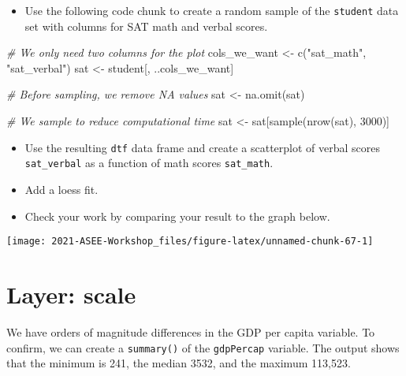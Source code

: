 \documentclass[
]{book}
\newenvironment{Shaded}{\begin{snugshade}}{\end{snugshade}}
\newcommand{\CommentTok}[1]{\textcolor[rgb]{0.56,0.35,0.01}{\textit{#1}}}
\newcommand{\DecValTok}[1]{\textcolor[rgb]{0.00,0.00,0.81}{#1}}
\newcommand{\FunctionTok}[1]{\textcolor[rgb]{0.00,0.00,0.00}{#1}}
\newcommand{\NormalTok}[1]{#1}
\newcommand{\OtherTok}[1]{\textcolor[rgb]{0.56,0.35,0.01}{#1}}
\newcommand{\StringTok}[1]{\textcolor[rgb]{0.31,0.60,0.02}{#1}}
\providecommand{\tightlist}{%
  \setlength{\itemsep}{0pt}\setlength{\parskip}{0pt}}
\begin{document}
\begin{itemize}
\tightlist
\item
  Use the following code chunk to create a random sample of the \texttt{student} data set with columns for SAT math and verbal scores.
\end{itemize}

\begin{Shaded}
\begin{Highlighting}[]
\CommentTok{\# We only need two columns for the plot}
\NormalTok{cols\_we\_want }\OtherTok{\textless{}{-}} \FunctionTok{c}\NormalTok{(}\StringTok{"sat\_math"}\NormalTok{, }\StringTok{"sat\_verbal"}\NormalTok{)}
\NormalTok{sat }\OtherTok{\textless{}{-}}\NormalTok{ student[, ..cols\_we\_want]}

\CommentTok{\# Before sampling, we remove NA values }
\NormalTok{sat }\OtherTok{\textless{}{-}} \FunctionTok{na.omit}\NormalTok{(sat)}

\CommentTok{\# We sample to reduce computational time }
\NormalTok{sat }\OtherTok{\textless{}{-}}\NormalTok{ sat[}\FunctionTok{sample}\NormalTok{(}\FunctionTok{nrow}\NormalTok{(sat), }\DecValTok{3000}\NormalTok{)]}
\end{Highlighting}
\end{Shaded}

\begin{itemize}
\tightlist
\item
  Use the resulting \texttt{dtf} data frame and create a scatterplot of verbal scores \texttt{sat\_verbal} as a function of math scores \texttt{sat\_math}.\\
\item
  Add a loess fit.\\
\item
  Check your work by comparing your result to the graph below.
\end{itemize}

\texttt{[image: 2021-ASEE-Workshop\_files/figure-latex/unnamed-chunk-67-1]}

\hypertarget{layer-scale}{%
\section{Layer: scale}\label{layer-scale}}

We have orders of magnitude differences in the GDP per capita variable. To confirm, we can create a \texttt{summary()} of the \texttt{gdpPercap} variable. The output shows that the minimum is 241, the median 3532, and the maximum 113,523.
\end{document}

